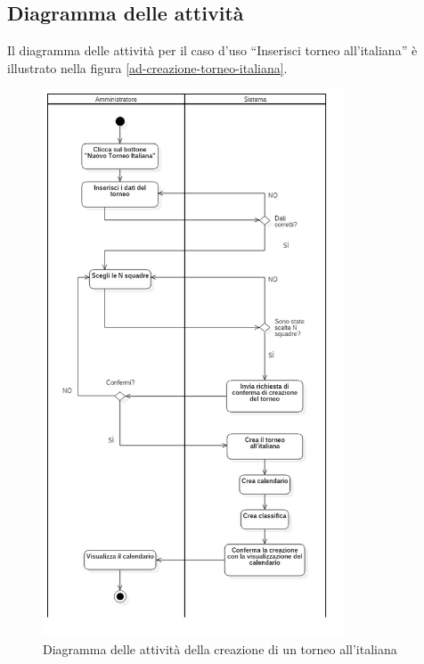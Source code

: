 \subsection*{Diagramma delle attività}
Il diagramma delle attività per il caso d'uso ``Inserisci torneo all'italiana'' è illustrato nella figura \vref{ad-creazione-torneo-italiana}.


%
%
\begin{figure}[h]
	\centering
	\includegraphics[width=0.8\textwidth]
	{immagini/ad-creazione-torneo-italiana}
	
	\caption{Diagramma delle attività della creazione di un torneo all'italiana}
	\label{ad-creazione-torneo-italiana}
\end{figure}


%
%
